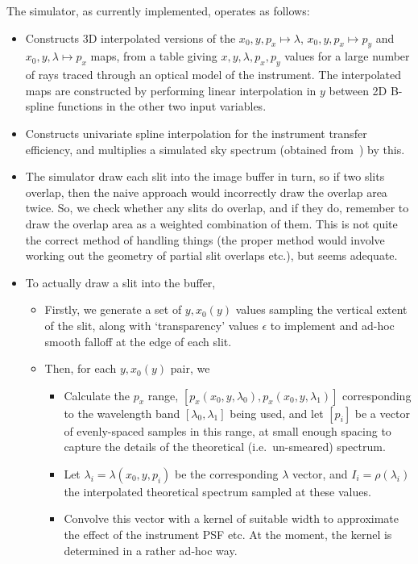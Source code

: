 The simulator, as currently implemented, operates as follows:
%
\begin{itemize}
\item Constructs 3D interpolated versions of the $x_0, y, p_x \mapsto
\lambda$, $x_0, y, p_x \mapsto p_y$ and $x_0, y, \lambda \mapsto p_x$
maps, from a table giving $x, y, \lambda, p_x, p_y$ values for a large
number of rays traced through an optical model of the instrument. The
interpolated maps are constructed by performing linear interpolation in
$y$ between 2D B-spline functions in the other two input variables.
%
\item Constructs univariate spline interpolation for the instrument
transfer efficiency, and multiplies a simulated sky spectrum (obtained
from~\cite{geminibackground}) by this.
%
\item
The simulator draw each slit into the image buffer in turn, so if two
slits overlap, then the naive approach would incorrectly draw the
overlap area twice. So, we check whether any slits do overlap, and if
they do, remember to draw the overlap area as a weighted combination
of them. This is not quite the correct method of handling things (the
proper method would involve working out the geometry of partial slit
overlaps etc.), but seems adequate.
%
\item
To actually draw a slit into the buffer,
\begin{itemize}
\item Firstly, we generate a set of $y, x_0(y)$ values sampling the vertical
extent of the slit, along with `transparency' values $\epsilon$ to implement
and ad-hoc smooth falloff at the edge of each slit.
%
\item Then, for each $y, x_0(y)$ pair, we
\begin{itemize}
\item Calculate the $p_x$ range, $[p_x(x_0, y, \lambda_0), p_x (x_0, y, \lambda_1)]$
corresponding to the wavelength band $[\lambda_0, \lambda_1]$ being used, and
let $[p_i]$ be a vector of evenly-spaced samples in this range, at small enough
spacing to capture the details of the theoretical (i.e.\ un-smeared) spectrum.
%
\item Let $\lambda_i = \lambda (x_0, y, p_i)$ be the corresponding
$\lambda$ vector, and $I_i = \rho (\lambda_i)$ the interpolated
theoretical spectrum sampled at these values.
%
\item Convolve this vector with a kernel of suitable width to
approximate the effect of the instrument PSF etc. At the moment, the
kernel is determined in a rather ad-hoc way.

\end{itemize}
\end{itemize}
\end{itemize}
